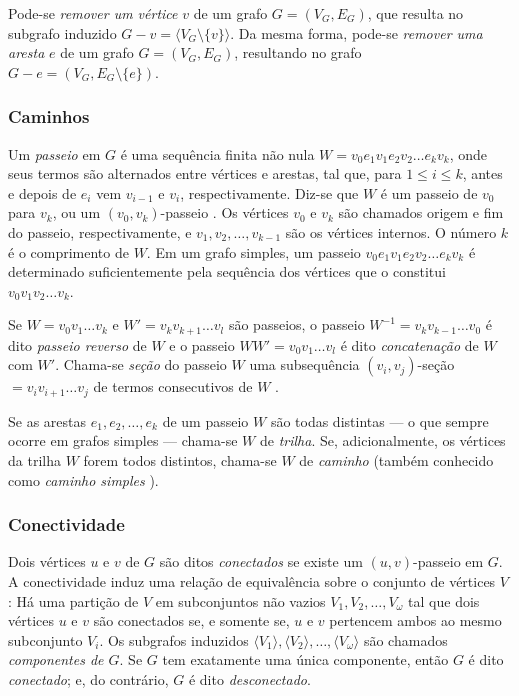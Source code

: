 \documentclass[a4paper,12pt]{article}
\begin{document}
Pode-se \textit{remover um vértice} $v$ de um grafo $G = (V_G, E_G)$, que resulta no subgrafo induzido $G - v = \langle V_G \setminus \{v\}\rangle$. Da mesma forma, pode-se \textit{remover uma aresta} $e$ de um grafo $G = (V_G, E_G)$, resultando no grafo $G-e = (V_G, E_G \setminus \{e\})$.

\subsubsection{Caminhos}

Um \textit{passeio} em $G$ é uma sequência finita não nula $W = v_0e_1v_1e_2v_2\dots e_kv_k$, onde seus termos são alternados entre vértices e arestas, tal que, para $1\leq i \leq k$, antes e depois de $e_i$ vem $v_{i-1}$ e $v_i$, respectivamente. Diz-se que $W$ é um passeio de $v_0$ para $v_k$, ou um $(v_0,v_k)$-passeio \cite{graphTheoryApplicationsBondy}. Os vértices $v_0$ e $v_k$ são chamados origem e fim do passeio, respectivamente, e $v_1,v_2,\dots,v_{k-1}$ são os vértices internos. O número $k$ é o comprimento de $W$. 
Em um grafo simples, um passeio $v_0e_1v_1e_2v_2\dots e_kv_k$ é determinado suficientemente pela sequência dos vértices que o constitui $v_0v_1v_2\dots v_k$.

Se $W=v_0v_1\dots v_k$ e $W' = v_kv_{k+1}\dots v_l$ são passeios, o passeio $W^{-1} = v_kv_{k-1}\dots v_0$ é dito \textit{passeio reverso} de $W$ e o passeio $WW' = v_0v_1\dots v_l$ é dito \textit{concatenação} de $W$ com $W'$. Chama-se \textit{seção} do passeio $W$ uma subsequência $(v_i,v_j)$-seção $= v_iv_{i+1}\dots v_j$ de termos consecutivos de $W$ \cite{graphTheoryApplicationsBondy}. 

Se as arestas $e_1,e_2,\dots,e_k$ de um passeio $W$ são todas distintas --- o que sempre ocorre em grafos simples --- chama-se $W$ de \textit{trilha}.  Se, adicionalmente, os vértices da trilha $W$ forem todos distintos, chama-se $W$ de \textit{caminho} (também conhecido como \textit{caminho simples} \cite{grafosPremioElon}).

\subsubsection{Conectividade}

Dois vértices $u$ e $v$ de $G$ são ditos \textit{conectados} se existe um $(u,v)$-passeio em $G$. A conectividade induz uma relação de equivalência sobre o conjunto de vértices $V$ \cite{graphTheoryApplicationsBondy}: Há uma partição de $V$ em subconjuntos não vazios $V_1, V_2, \dots, V_\omega$ tal que dois vértices $u$ e $v$ são conectados se, e somente se, $u$ e $v$ pertencem ambos ao mesmo subconjunto $V_i$. Os subgrafos induzidos $\langle V_1\rangle, \langle V_2\rangle, \dots,\langle V_\omega\rangle$ são chamados \textit{componentes de $G$}. Se $G$ tem exatamente uma única componente, então $G$ é dito \textit{conectado}; e, do contrário, $G$ é dito \textit{desconectado}. 
\end{document}
